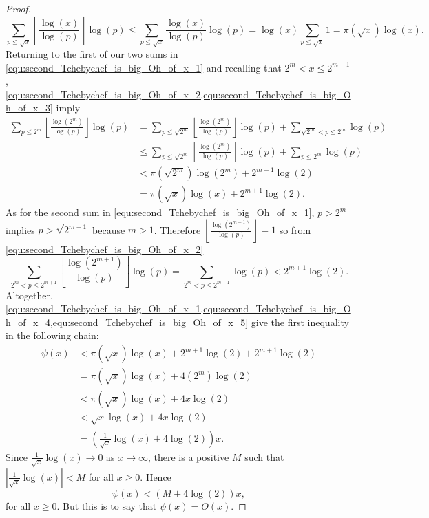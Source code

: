 \begin{proof}
        \begin{equation}\label{equ:second_Tchebychef_is_big_Oh_of_x_3}
          \sum_{p \le \sqrt{x}}\left\lfloor\frac{\log(x)}{\log(p)}\right\rfloor\log(p) \le \sum_{p \le \sqrt{x}}\frac{\log(x)}{\log(p)}\log(p) = \log(x)\sum_{p \le \sqrt{x}}1 = \pi(\sqrt{x})\log(x).
        \end{equation}
        Returning to the first of our two sums in \cref{equ:second_Tchebychef_is_big_Oh_of_x_1} and recalling that $2^{m} < x \le 2^{m+1}$, \cref{equ:second_Tchebychef_is_big_Oh_of_x_2,equ:second_Tchebychef_is_big_Oh_of_x_3} imply
        \begin{equation}\label{equ:second_Tchebychef_is_big_Oh_of_x_4}
          \begin{aligned}
            \sum_{p \le 2^{m}}\left\lfloor\frac{\log(2^{m})}{\log(p)}\right\rfloor\log(p) &= \sum_{p \le \sqrt{2^{m}}}\left\lfloor\frac{\log(2^{m})}{\log(p)}\right\rfloor\log(p)+\sum_{\sqrt{2^{m}} < p \le 2^{m}}\log(p) \\
            &\le \sum_{p \le \sqrt{2^{m}}}\left\lfloor\frac{\log(2^{m})}{\log(p)}\right\rfloor\log(p)+\sum_{p \le 2^{m}}\log(p) \\
            &< \pi(\sqrt{2^{m}})\log(2^{m})+2^{m+1}\log(2) \\
            &= \pi(\sqrt{x})\log(x)+2^{m+1}\log(2).
          \end{aligned}
        \end{equation}
        As for the second sum in \cref{equ:second_Tchebychef_is_big_Oh_of_x_1}, $p > 2^{m}$ implies $p > \sqrt{2^{m+1}}$ because $m > 1$. Therefore $\left\lfloor\frac{\log(2^{m+1})}{\log(p)}\right\rfloor = 1$ so from \cref{equ:second_Tchebychef_is_big_Oh_of_x_2}
        \begin{equation}\label{equ:second_Tchebychef_is_big_Oh_of_x_5}
          \sum_{2^{m} < p \le 2^{m+1}}\left\lfloor\frac{\log(2^{m+1})}{\log(p)}\right\rfloor\log(p) = \sum_{2^{m} < p \le 2^{m+1}}\log(p) < 2^{m+1}\log(2).
        \end{equation}
        Altogether, \cref{equ:second_Tchebychef_is_big_Oh_of_x_1,equ:second_Tchebychef_is_big_Oh_of_x_4,equ:second_Tchebychef_is_big_Oh_of_x_5} give the first inequality in the following chain:
        \begin{align*}
          \psi(x) &< \pi(\sqrt{x})\log(x)+2^{m+1}\log(2)+2^{m+1}\log(2) \\
          &= \pi(\sqrt{x})\log(x)+4(2^{m})\log(2) \\
          &< \pi(\sqrt{x})\log(x)+4x\log(2) \\
          &< \sqrt{x}\log(x)+4x\log(2) \\
          &= \left(\frac{1}{\sqrt{x}}\log(x)+4\log(2)\right)x.
        \end{align*}
        Since $\frac{1}{\sqrt{x}}\log(x) \to 0$ as $x \to \infty$, there is a positive $M$ such that $\left|\frac{1}{\sqrt{x}}\log(x)\right| < M$ for all $x \ge 0$. Hence
        \[
          \psi(x) < (M+4\log(2))x,
        \]
        for all $x \ge 0$. But this is to say that $\psi(x) = O(x)$.
      \end{proof}

